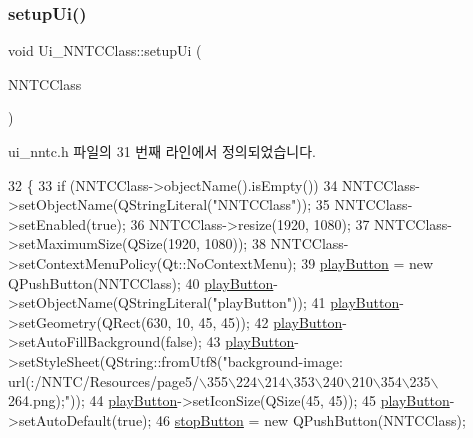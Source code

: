 \subsubsection{\texorpdfstring{setup\+Ui()}{setupUi()}}
{\footnotesize\ttfamily void Ui\+\_\+\+N\+N\+T\+C\+Class\+::setup\+Ui (\begin{DoxyParamCaption}\item[{Q\+Dialog $\ast$}]{N\+N\+T\+C\+Class }\end{DoxyParamCaption})\hspace{0.3cm}{\ttfamily [inline]}}



ui\+\_\+nntc.\+h 파일의 31 번째 라인에서 정의되었습니다.


\begin{DoxyCode}
32     \{
33         \textcolor{keywordflow}{if} (NNTCClass->objectName().isEmpty())
34             NNTCClass->setObjectName(QStringLiteral(\textcolor{stringliteral}{"NNTCClass"}));
35         NNTCClass->setEnabled(\textcolor{keyword}{true});
36         NNTCClass->resize(1920, 1080);
37         NNTCClass->setMaximumSize(QSize(1920, 1080));
38         NNTCClass->setContextMenuPolicy(Qt::NoContextMenu);
39         \mbox{\hyperlink{class_ui___n_n_t_c_class_a6e604f467f5d7264f8d23f0cf54a6fdf}{playButton}} = \textcolor{keyword}{new} QPushButton(NNTCClass);
40         \mbox{\hyperlink{class_ui___n_n_t_c_class_a6e604f467f5d7264f8d23f0cf54a6fdf}{playButton}}->setObjectName(QStringLiteral(\textcolor{stringliteral}{"playButton"}));
41         \mbox{\hyperlink{class_ui___n_n_t_c_class_a6e604f467f5d7264f8d23f0cf54a6fdf}{playButton}}->setGeometry(QRect(630, 10, 45, 45));
42         \mbox{\hyperlink{class_ui___n_n_t_c_class_a6e604f467f5d7264f8d23f0cf54a6fdf}{playButton}}->setAutoFillBackground(\textcolor{keyword}{false});
43         \mbox{\hyperlink{class_ui___n_n_t_c_class_a6e604f467f5d7264f8d23f0cf54a6fdf}{playButton}}->setStyleSheet(QString::fromUtf8(\textcolor{stringliteral}{"background-image:
       url(:/NNTC/Resources/page5/\(\backslash\)355\(\backslash\)224\(\backslash\)214\(\backslash\)353\(\backslash\)240\(\backslash\)210\(\backslash\)354\(\backslash\)235\(\backslash\)264.png);"}));
44         \mbox{\hyperlink{class_ui___n_n_t_c_class_a6e604f467f5d7264f8d23f0cf54a6fdf}{playButton}}->setIconSize(QSize(45, 45));
45         \mbox{\hyperlink{class_ui___n_n_t_c_class_a6e604f467f5d7264f8d23f0cf54a6fdf}{playButton}}->setAutoDefault(\textcolor{keyword}{true});
46         \mbox{\hyperlink{class_ui___n_n_t_c_class_a748e190a62458531e66a574cc556e32d}{stopButton}} = \textcolor{keyword}{new} QPushButton(NNTCClass);

\end{DoxyCode}
